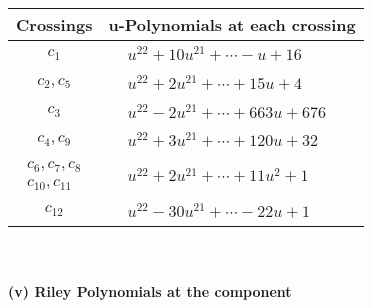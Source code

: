 \documentclass[1p]{elsarticle_modified}
\theoremstyle{definition}
\begin{document}
\begin{tabular}{m{50pt}|m{274pt}}
Crossings & \hspace{64pt}u-Polynomials at each crossing \\
\hline $$\begin{aligned}c_{1}\end{aligned}$$&$\begin{aligned}
&u^{22}+10 u^{21}+\cdots- u+16
\end{aligned}$\\
\hline $$\begin{aligned}c_{2},c_{5}\end{aligned}$$&$\begin{aligned}
&u^{22}+2 u^{21}+\cdots+15 u+4
\end{aligned}$\\
\hline $$\begin{aligned}c_{3}\end{aligned}$$&$\begin{aligned}
&u^{22}-2 u^{21}+\cdots+663 u+676
\end{aligned}$\\
\hline $$\begin{aligned}c_{4},c_{9}\end{aligned}$$&$\begin{aligned}
&u^{22}+3 u^{21}+\cdots+120 u+32
\end{aligned}$\\
\hline $$\begin{aligned}c_{6},c_{7},c_{8}\\c_{10},c_{11}\end{aligned}$$&$\begin{aligned}
&u^{22}+2 u^{21}+\cdots+11 u^2+1
\end{aligned}$\\
\hline $$\begin{aligned}c_{12}\end{aligned}$$&$\begin{aligned}
&u^{22}-30 u^{21}+\cdots-22 u+1
\end{aligned}$\\
\hline
\end{tabular}\\~\\
\newpage\renewcommand{\arraystretch}{1}
\flushleft \textbf{(v) Riley Polynomials at the component}\newline \\
\end{document}
